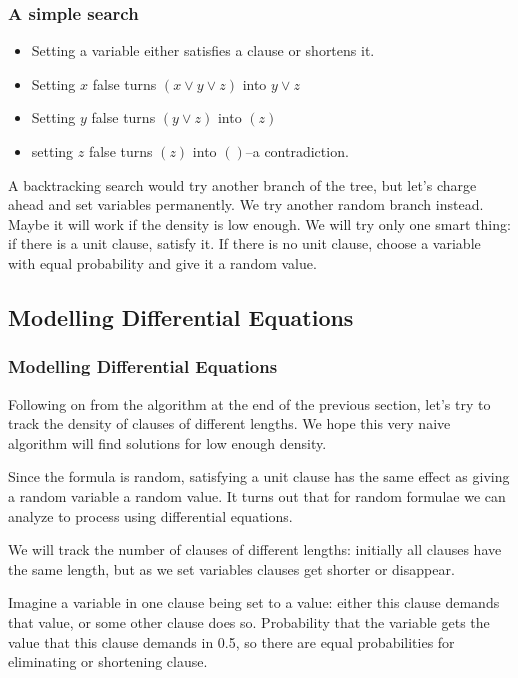 \documentclass[]{article}
\begin{document}
\subsubsection{A simple search}

\begin{itemize}
	\item Setting a variable either satisfies a clause or shortens it.
	\item Setting $x$ false turns $(x\lor y \lor z)$ into $y \lor z$
	\item Setting $y$ false turns $(y \lor z)$ into $(z)$
	\item setting $z$ false turns $(z)$ into $()$--a contradiction.
\end{itemize}

A backtracking search would try another branch of the tree, but let's charge ahead and set variables permanently. We try another random branch instead. Maybe it will work if the density is low enough. We will try only one smart thing: if there is a unit clause, satisfy it. If there is no unit clause, choose a variable  with equal probability and give it a random value.

\subsection{Modelling Differential Equations}

\subsubsection{Modelling Differential Equations}
Following on from the algorithm at the end of the previous section, let's try to track the density of clauses of different lengths. We hope this very naive algorithm will find solutions for low enough density.

Since the formula is random, satisfying a unit clause has the same effect as giving a random variable a random value. It turns out that for random formulae we can analyze to process using differential equations.

We will track the number of clauses of different lengths: initially all clauses have the same length, but as we set variables clauses get shorter or disappear.

Imagine a variable in one clause being set to a value: either this clause demands that value, or some other clause does so. Probability that the variable gets the value that this clause demands in 0.5, so there are equal probabilities for eliminating or shortening clause. 
\end{document}
